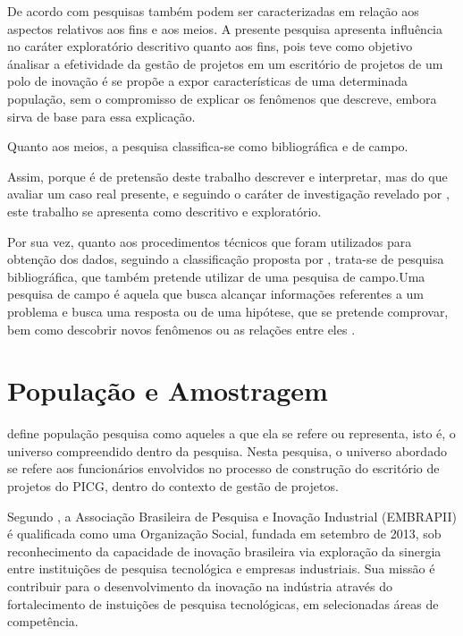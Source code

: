 De acordo com  pesquisas também podem ser caracterizadas em relação aos aspectos relativos aos fins e aos meios. A presente pesquisa apresenta influência no caráter exploratório descritivo quanto aos fins, pois teve como objetivo \'analisar a efetividade da gestão de projetos em um escritório de projetos de um polo de inovação \'e se propõe a expor características de uma determinada população, sem o compromisso de explicar os fenômenos que descreve, embora sirva de base para essa explicação.

Quanto aos meios, a pesquisa classifica-se como bibliográfica e de campo.

Assim, porque é de pretensão deste trabalho descrever e interpretar, mas do que avaliar um caso real presente, e seguindo o caráter de investigação revelado por , este trabalho se apresenta como descritivo e exploratório.

Por sua vez, quanto aos procedimentos técnicos que foram utilizados para obtenção dos dados, seguindo a classificação proposta por , trata-se de pesquisa bibliográfica, que também pretende utilizar de uma pesquisa de campo.Uma pesquisa de campo é aquela que busca alcançar informações referentes a um problema e busca uma resposta ou de uma hipótese, que se pretende comprovar, bem como descobrir novos fenômenos ou as relações entre eles \cite{de2007metodologia}.


\section{População e Amostragem}

 define população pesquisa como aqueles a que ela se refere ou representa, isto é, o universo compreendido dentro da pesquisa. Nesta pesquisa, o universo abordado se refere aos funcionários envolvidos no processo de construção do escritório de projetos do PICG, dentro do contexto de gestão de projetos.

Segundo , a Associação Brasileira de Pesquisa e Inovação Industrial (EMBRAPII) é qualificada como uma Organização Social, fundada em setembro de 2013, sob reconhecimento da capacidade de inovação brasileira via exploração da sinergia entre instituições de pesquisa tecnológica e empresas industriais. Sua missão é contribuir para o desenvolvimento da inovação na indústria através do fortalecimento de instuições de pesquisa tecnológicas, em selecionadas áreas de competência.

